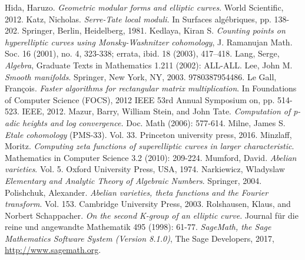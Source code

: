 \documentclass[10pt,]{book}
\numberwithin{equation}{section}
\begin{document}
\begin{thebibliography}{9}
\hypertarget{bib-hida-geometric}{}Hida, Haruzo. \textit{Geometric modular forms and elliptic curves}. World Scientific, 2012.
\hypertarget{bib-katz-serre-tate}{}Katz, Nicholas. \textit{Serre-Tate local moduli}. In Surfaces algébriques, pp. 138-202. Springer, Berlin, Heidelberg, 1981.
\hypertarget{bib-kedlaya-counting}{}Kedlaya, Kiran S. \textit{Counting points on hyperelliptic curves using Monsky-Washnitzer cohomology}, J. Ramanujan Math. Soc. 16 (2001), no. 4, 323-338; errata, ibid. 18 (2003), 417--418.
\hypertarget{bib-lang-algebra}{}Lang, Serge,  \textit{Algebra}, Graduate Texts in Mathematics 1.211 (2002): ALL-ALL.
\hypertarget{bib-lee-smooth}{}Lee, John M. \textit{Smooth manifolds}. Springer, New York, NY, 2003. 9780387954486.
\hypertarget{bib-le-gall}{}Le Gall, François. \textit{Faster algorithms for rectangular matrix multiplication}. In Foundations of Computer Science (FOCS), 2012 IEEE 53rd Annual Symposium on, pp. 514-523. IEEE, 2012.
\hypertarget{bib-mazur-stein-tate}{}Mazur, Barry, William Stein, and John Tate. \textit{Computation of p-adic heights and log convergence.} Doc. Math (2006): 577-614.
\hypertarget{bib-milne-etale}{}Milne, James S. \textit{Etale cohomology} (PMS-33). Vol. 33. Princeton university press, 2016.
\hypertarget{bib-minzlaff}{}Minzlaff, Moritz. \textit{Computing zeta functions of superelliptic curves in larger characteristic}. Mathematics in Computer Science 3.2 (2010): 209-224.
\hypertarget{bib-mumford-abvar}{}Mumford, David. \textit{Abelian varieties}. Vol. 5. Oxford University Press, USA, 1974.
\hypertarget{bib-narkiewicz}{}Narkiewicz, Wladyslaw  \textit{Elementary and Analytic Theory of Algebraic Numbers}. Springer, 2004.
\hypertarget{bib-polishchuck}{}Polishchuk, Alexander. \textit{Abelian varieties, theta functions and the Fourier transform}. Vol. 153. Cambridge University Press, 2003.
\hypertarget{bib-rolshausen}{}Rolshausen, Klaus, and Norbert Schappacher.  \textit{On the second K-group of an elliptic curve.}  Journal für die reine und angewandte Mathematik 495 (1998): 61-77.
\hypertarget{bib-sage}{}\textit{SageMath, the Sage Mathematics Software System (Version 8.1.0)}, The Sage Developers, 2017, \url{http://www.sagemath.org}.

\end{thebibliography}
\end{document}
